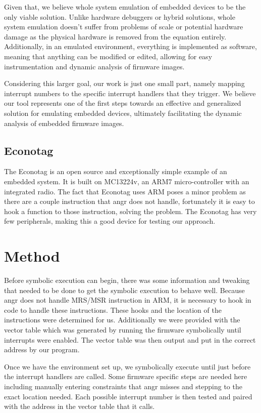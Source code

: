 \documentclass[letterpaper, 10 pt, conference]{ieeeconf}
\begin{document}
Given that, we believe whole system emulation of embedded devices to be the only viable solution. Unlike hardware debuggers or hybrid solutions, whole system emulation doesn't suffer from problems of scale or potential hardware damage as the physical hardware is removed from the equation entirely. Additionally, in an emulated environment, everything is implemented as software, meaning that anything can be modified or edited, allowing for easy instrumentation and dynamic analysis of firmware images.

Considering this larger goal, our work is just one small part, namely mapping interrupt numbers to the specific interrupt handlers that they trigger. We believe our tool represents one of the first steps towards an effective and generalized solution for emulating embedded devices, ultimately facilitating the dynamic analysis of embedded firmware images.

\subsection{Econotag}
The Econotag is an open source and exceptionally simple example of an embedded system. It is built on MC13224v, an ARM7 micro-controller with an integrated radio. The fact that Econotag uses ARM poses a minor problem as there are a couple instruction that angr does not handle, fortunately it is easy to hook a function to those instruction, solving the problem. The Econotag has very few peripherals, making this a good device for testing our approach.

\section{Method}
Before symbolic execution can begin, there was some information and tweaking that needed to be done to get the symbolic execution to behave well. Because angr does not handle MRS/MSR instruction in ARM, it is necessary to hook in code to handle these instructions. These hooks and the location of the instructions were determined for us. Additionally we were provided with the vector table which was generated by running the firmware symbolically until interrupts were enabled. %
The vector table was then output and put in the correct address by our program. 

Once we have the environment set up, we symbolically execute until just before the interrupt handlers are called. Some firmware specific steps are needed here including manually entering constraints that angr misses and stepping to the exact location needed. Each possible interrupt number is then tested and paired with the address in the vector table that it calls.
\end{document}
